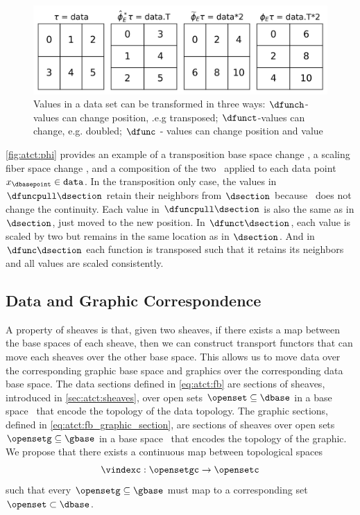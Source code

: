 \documentclass[10pt,journal,compsoc]{IEEEtran}
\theoremstyle{definition}
\theoremstyle{remark}
\begin{document}
\begin{figure}[h!]
  \includegraphics[width=\columnwidth]{phi.png}
  \caption{Values in a data set can be transformed in three ways: $\dfunch$-values can change position, .e.g transposed;  $\dfunct$-values can change, e.g. doubled; $\dfunc$ - values can change position and value  \label{fig:atct:phi}}
\end{figure}
\autoref{fig:atct:phi} provides an example of a transposition base space change \dfunch, a scaling fiber space change \dfunct, and a composition of the two \dfunc\ applied to each data point $x_{\dbasepoint} \in \texttt{data}$. In the transposition only case, the values in $\dfuncpull\dsection$ retain their neighbors from $\dsection$ because \dfunc\ does not change the continuity. Each value in $\dfuncpull\dsection$ is also the same as in $\dsection$, just moved to the new position. In $\dfunct\dsection$, each value is scaled by two but remains in the same location as in $\dsection$. And in $\dfunc\dsection$ each function is transposed such that it retains its neighbors and all values are scaled consistently. 

\subsection{Data and Graphic Correspondence}
\label{sec:atct:xi}
A property of sheaves is that, given two sheaves, if there exists a map between the base spaces of each sheave, then we can construct transport functors that can move each sheaves over the other base space. This allows us to move data over the corresponding graphic base space and graphics over the corresponding data base space. The data sections defined in \autoref{eq:atct:fb} are sections of sheaves, introduced in \autoref{sec:atct:sheaves}, over open sets $\openset \subseteq \dbase$ in a base space \dbase\ that encode the topology of the data topology. The graphic sections, defined in \autoref{eq:atct:fb_graphic_section}, are sections of sheaves over open sets $\opensetg \subseteq \gbase$ in a base space \gbase\ that encodes the topology of the graphic. We propose that there exists a continuous \textcolor{functor}{map between topological spaces} \vindexc 
\begin{equation}
  \label{eq:atct:xi}
  \vindexc: \opensetgc \rightarrow \opensetc 
\end{equation}
such that every $\opensetg \subseteq \gbase$ must map to a corresponding set $\openset \subset \dbase$. 
\end{document}
